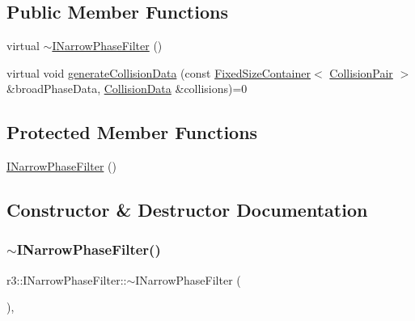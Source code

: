 \subsection*{Public Member Functions}
\begin{DoxyCompactItemize}
\item 
virtual \mbox{\hyperlink{classr3_1_1_i_narrow_phase_filter_a87d190166b99b0ace5e6005d9e62562b}{$\sim$\+I\+Narrow\+Phase\+Filter}} ()
\item 
virtual void \mbox{\hyperlink{classr3_1_1_i_narrow_phase_filter_a800e26eea0b0a899cde273e2931c22db}{generate\+Collision\+Data}} (const \mbox{\hyperlink{classr3_1_1_fixed_size_container}{Fixed\+Size\+Container}}$<$ \mbox{\hyperlink{classr3_1_1_collision_pair}{Collision\+Pair}} $>$ \&broad\+Phase\+Data, \mbox{\hyperlink{classr3_1_1_collision_data}{Collision\+Data}} \&collisions)=0
\end{DoxyCompactItemize}
\subsection*{Protected Member Functions}
\begin{DoxyCompactItemize}
\item 
\mbox{\hyperlink{classr3_1_1_i_narrow_phase_filter_a48c0812ce04a7e258c8fbbf34c8b85a6}{I\+Narrow\+Phase\+Filter}} ()
\end{DoxyCompactItemize}


\subsection{Constructor \& Destructor Documentation}
\mbox{\label{classr3_1_1_i_narrow_phase_filter_a87d190166b99b0ace5e6005d9e62562b}} 
\subsubsection{\texorpdfstring{$\sim$\+I\+Narrow\+Phase\+Filter()}{~INarrowPhaseFilter()}}
{\footnotesize\ttfamily r3\+::\+I\+Narrow\+Phase\+Filter\+::$\sim$\+I\+Narrow\+Phase\+Filter (\begin{DoxyParamCaption}{ }\end{DoxyParamCaption})\hspace{0.3cm}{\ttfamily [virtual]}, {\ttfamily [default]}}

